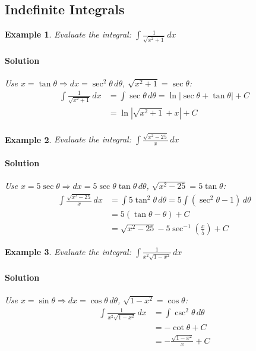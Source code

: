 \documentclass[letterpaper, 11pt, openany]{book}
\theoremstyle{mytheoremstyle}
\theoremstyle{myexamplestyle}
\newtheorem{example}{Example}[section]
\newenvironment{solution}{\paragraph{\sffamily \smaller \fontseries{b}\selectfont Solution}}{\hfill\faSquare}
\begin{document}
\subsection{Indefinite Integrals}
\begin{example}\label{e:trigsubtan}
    Evaluate the integral: $\displaystyle \int \frac{1}{\sqrt{x^{2} + 1}}\, dx$
    
    \begin{solution}
        Use $x = \tan \theta \Rightarrow dx = \sec^{2} \theta\, d\theta$, $\sqrt{x^{2} + 1} = \sec \theta$:
        \begin{align*}
            \int \frac{1}{\sqrt{x^{2} + 1}}\, dx &= \int \sec \theta \, d\theta = \ln \left| \sec \theta + \tan \theta \right| + C\\
            &= \ln \left| \sqrt{x^{2} + 1} + x \right| + C\\
        \end{align*}
    \end{solution}
\end{example}

\begin{example}\label{e:trigsubsec}
    Evaluate the integral: $\displaystyle \int \frac{\sqrt{x^{2} - 25}}{x}\, dx$
    
    \begin{solution}
        Use $x = 5\sec \theta \Rightarrow dx = 5\sec \theta \tan \theta \, d\theta$, $\sqrt{x^{2} - 25} = 5\tan \theta$:
        \begin{align*}
            \int \frac{\sqrt{x^{2} - 25}}{x}\, dx &= \int 5 \tan^{2} \theta \, d\theta = 5 \int \left( \sec^{2} \theta - 1 \right)\, d\theta \\        
            &= 5 \left( \tan \theta - \theta \right) + C \\
            &=  \sqrt{x^{2} - 25} - 5\sec^{-1} \left(\frac{x}{5}\right)  + C
        \end{align*}
    \end{solution}
\end{example}

\begin{example}\label{e:trigsubsin}
    Evaluate the integral: $\displaystyle \int \frac{1}{x^{2} \sqrt{1-x^{2}}}\, dx$
    
    \begin{solution}
        Use $x = \sin \theta \Rightarrow dx = \cos \theta \, d\theta$, $\sqrt{1 - x^{2}} = \cos \theta$:
        \begin{align*}
            \int \frac{1}{x^{2} \sqrt{1-x^{2}}}\, dx &= \int \csc^{2} \theta \, d\theta \\
            &= -\cot \theta + C \\
            &= -\frac{\sqrt{1-x^{2}}}{x} + C
        \end{align*}
    \end{solution}
\end{example}
\end{document}
